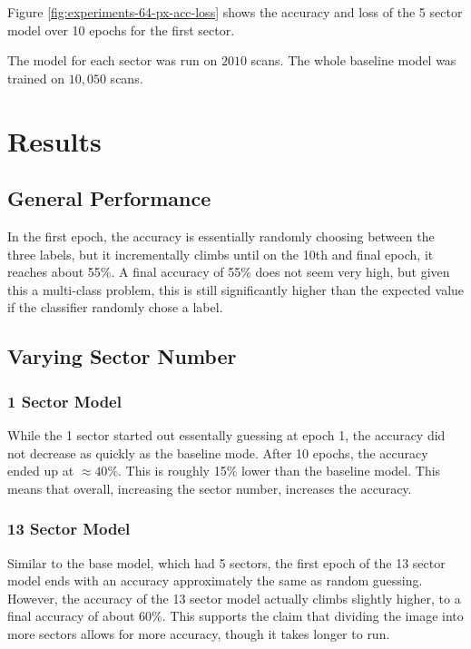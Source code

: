 \documentclass[10pt,twocolumn,letterpaper]{article}
\begin{document}
      Figure \ref{fig:experiments-64-px-acc-loss} shows the accuracy and loss of the 5 sector model over 10 epochs for the first sector.

      The model for each sector was run on $2010$ scans. The whole baseline model was trained on $10,050$ scans.
\section{Results} \label{sec:results}

   \subsection{General Performance} \label{sec:results-general-performance}

      In the first epoch, the accuracy is essentially randomly choosing between the three labels, but it incrementally climbs until on the 10th and final epoch, it reaches about 55\%. A final accuracy of 55\% does not seem very high, but given this a multi-class problem, this is still significantly higher than the expected value if the classifier randomly chose a label.

   \subsection{Varying Sector Number} \label{sec:results-sector}

      \subsubsection{1 Sector Model} \label{sec:results-sector-1}
         While the 1 sector started out essentally guessing at epoch 1, the accuracy did not decrease as quickly as the baseline mode. After 10 epochs, the accuracy ended up at $\approx 40\%$. This is roughly 15\% lower than the baseline model. This means that overall, increasing the sector number, increases the accuracy.
      \subsubsection{13 Sector Model} \label{sec:results-sector-13}
         Similar to the base model, which had 5 sectors, the first epoch of the 13 sector model ends with an accuracy approximately the same as random guessing. However, the accuracy of the 13 sector model actually climbs slightly higher, to a final accuracy of about 60\%. This supports the claim that dividing the image into more sectors allows for more accuracy, though it takes longer to run.
\end{document}
